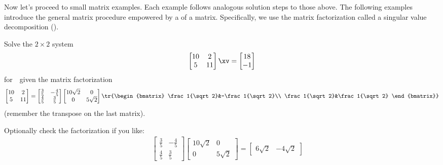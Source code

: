 Now let's proceed to small matrix examples.
Each example follows analogous solution steps to those above.
The following examples introduce the general matrix procedure empowered by a  of a matrix.
Specifically, we use the matrix factorization called a singular value decomposition (\svd).
\begin{example} \label{eg:2by2svd}
Solve the \(2\times2\) system
\begin{equation*}
\begin{bmatrix} 10&2\\5&11 \end{bmatrix}\xv
=\begin{bmatrix} 18\\-1 \end{bmatrix}
\end{equation*}
for~\xv\ given the matrix factorization
\begin{equation*}
\begin{bmatrix} 10&2\\5&11 \end{bmatrix}=
\begin{bmatrix} \frac35&-\frac45\\\frac45&\frac35 \end{bmatrix}
\begin{bmatrix} 10\sqrt2&0\\0&5\sqrt2 \end{bmatrix}
\tr{\begin{bmatrix} \frac1{\sqrt2}&-\frac1{\sqrt2}\\ \frac1{\sqrt2}&\frac1{\sqrt2} \end{bmatrix}}
\end{equation*}
(remember the transpose on the last matrix).
\begin{solution} 
Optionally check the factorization if you like:
\begin{eqnarray*}&&
\begin{bmatrix} \frac35&-\frac45\\\frac45&\frac35 \end{bmatrix}
\begin{bmatrix} 10\sqrt2&0\\0&5\sqrt2 \end{bmatrix}
=\begin{bmatrix} 6{\sqrt2}& -4{\sqrt2}

\end{bmatrix}
\end{eqnarray*}
\end{solution}
\end{example}
